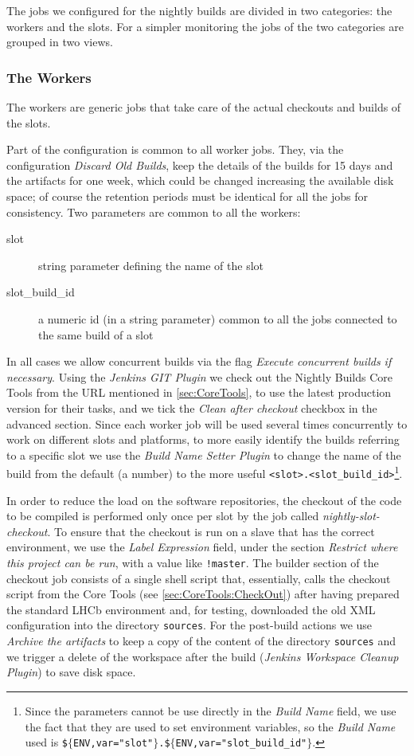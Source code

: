The jobs we configured for the nightly builds are divided in two categories: the
workers and the slots.  For a simpler monitoring the jobs of the two categories
are grouped in two views.

\subsubsection{The Workers}
\label{sec:Jenkins:Workers}
The workers are generic jobs that take care of the actual checkouts and builds
of the slots.

Part of the configuration is common to all worker jobs.  They, via the
configuration \emph{Discard Old Builds}, keep the details of the builds for 15
days and the artifacts for one week, which could be changed increasing the
available disk space; of course the retention periods must be identical for all
the jobs for consistency.  Two parameters are common to all the workers:
\begin{description}
  \item[slot] string parameter defining the name of the slot
  \item[slot\_build\_id] a numeric id (in a string parameter) common to all the
jobs connected to the same build of a slot
\end{description}
In all cases we allow concurrent builds via the flag \emph{Execute concurrent
builds if necessary}.  Using the \emph{Jenkins GIT Plugin} we check out the
Nightly Builds Core Tools from the URL mentioned in \ref{sec:CoreTools}, to use
the
latest production version for their tasks, and we tick the \emph{Clean after
checkout} checkbox in the advanced section.  Since each worker job will be used
several times concurrently to work on different slots and platforms, to more
easily identify the builds referring to a specific slot we use the \emph{Build
Name Setter Plugin} to change the name of the build from the default (a number)
to the more useful \verb|<slot>.<slot_build_id>|\footnote{Since the parameters
cannot be use directly in the \emph{Build Name} field, we use the fact that they
are used to set environment variables, so the \emph{Build Name} used is
\texttt{\$$\{$ENV,var="slot"$\}$.\$$\{$ENV,var="slot\_build\_id"$\}$}.}.

In order to reduce the load on the software repositories, the checkout of the
code to be compiled is performed only once per slot by the job called
\emph{nightly-slot-checkout}.  To ensure that the checkout is run on a slave
that has the correct environment, we use the \emph{Label Expression} field,
under the section \emph{Restrict where this project can be run}, with a value
like \verb|!master|.  The builder section of the checkout job consists of a
single shell script that, essentially, calls the checkout script from the Core
Tools (see \ref{sec:CoreTools:CheckOut}) after having prepared the standard LHCb
environment and, for testing, downloaded the old XML configuration into the
directory \texttt{sources}.  For the post-build actions we use \emph{Archive the
artifacts} to keep a copy of the content of the directory \texttt{sources} and
we trigger a delete of the workspace after the build (\emph{Jenkins Workspace
Cleanup Plugin}) to save disk space.


